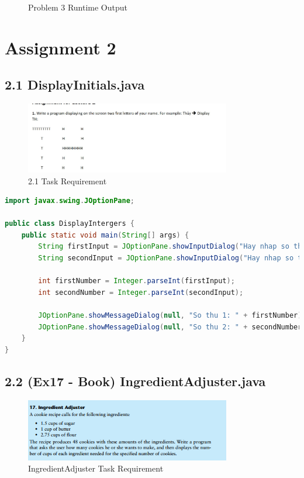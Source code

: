 \documentclass{article}
\begin{document}
\begin{figure}[H]
    \centering
    \caption{Problem 3 Runtime Output}
\end{figure}

\section*{Assignment 2}

\subsection*{2.1 DisplayInitials.java}

\begin{figure}[H]
    \centering
    \includegraphics[width=0.8\textwidth]{./Assets/Task requirements/Assignment2/1.png}
    \caption{2.1 Task Requirement}
\end{figure}

\begin{lstlisting}[language=Java, caption=DisplayInitials.java]
import javax.swing.JOptionPane;

public class DisplayIntergers {
    public static void main(String[] args) {
        String firstInput = JOptionPane.showInputDialog("Hay nhap so thu 1:");
        String secondInput = JOptionPane.showInputDialog("Hay nhap so thu 2:");

        int firstNumber = Integer.parseInt(firstInput);
        int secondNumber = Integer.parseInt(secondInput);

        JOptionPane.showMessageDialog(null, "So thu 1: " + firstNumber);
        JOptionPane.showMessageDialog(null, "So thu 2: " + secondNumber);
    }
}
\end{lstlisting}

\subsection*{2.2 (Ex17 - Book) IngredientAdjuster.java}

\begin{figure}[H]
    \centering
    \includegraphics[width=0.8\textwidth]{./Assets/Task requirements/Assignment2/2.17.png}
    \caption{IngredientAdjuster Task Requirement}
\end{figure}
\end{document}
